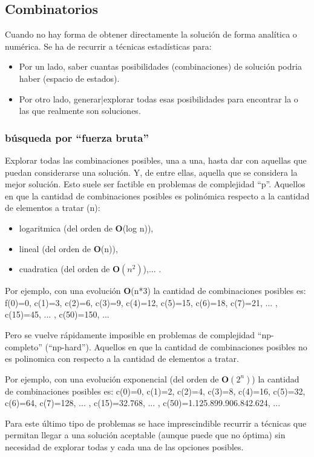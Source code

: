 \documentclass[spanish,12pt,a4paper,final,oneside]{book}
\begin{document}
\subsection{Combinatorios}
Cuando no hay forma de obtener directamente la solución de forma analítica o numérica. Se ha de recurrir a técnicas estadísticas para:
\begin{itemize}
\item Por un lado, saber cuantas posibilidades (combinaciones) de solución podria haber (espacio de estados).
\item Por otro lado, generar|explorar todas esas posibilidades para encontrar la o las que realmente son soluciones.
\end{itemize}

\subsubsection{búsqueda por ``fuerza bruta''}
Explorar todas las combinaciones posibles, una a una, hasta dar con aquellas que puedan considerarse una solución. Y, de entre ellas, aquella que se considera la mejor solución.
Esto suele ser factible en problemas de complejidad ``p''. Aquellos en que la cantidad de combinaciones posibles es polinómica respecto a la cantidad de elementos a tratar (n):
\begin{itemize}
\item logaritmica (del orden de \textbf{O}(log n)), 
\item lineal (del orden de \textbf{O}(n)), 
\item cuadratica (del orden de $\textbf{O}(n^2)$),... . 
\end{itemize}

Por ejemplo, con una evolución \textbf{O}(n*3) la cantidad de combinaciones posibles es: f(0)=0, c(1)=3, c(2)=6, c(3)=9, c(4)=12, c(5)=15, c(6)=18, c(7)=21, ... , c(15)=45, ... , c(50)=150, ...

Pero se vuelve rápidamente imposible en problemas de complejidad ``np-completo'' (``np-hard''). Aquellos en que la cantidad de combinaciones posibles no es polinomica con respecto a la cantidad de elementos a tratar. 

Por ejemplo, con una evolución exponencial (del orden de $\textbf{O}(2^n)$) la cantidad de combinaciones posibles es: c(0)=0, c(1)=2, c(2)=4, c(3)=8, c(4)=16, c(5)=32, c(6)=64, c(7)=128, ... , c(15)=32.768, ... , c(50)=1.125.899.906.842.624, ...

Para este último tipo de problemas se hace imprescindible recurrir a técnicas que permitan llegar a una solución aceptable (aunque puede que no óptima) sin necesidad de explorar todas y cada una de las opciones posibles.
\end{document}
